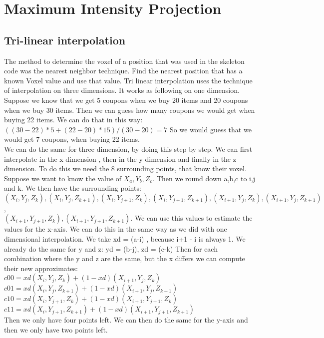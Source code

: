 \section{Maximum Intensity Projection}\label{Sec:Mip}
\subsection{Tri-linear interpolation}
The method to determine the voxel of a position that was used in the skeleton code was the nearest neighbor technique. 
Find the nearest position that has a known Voxel value and use that value. 
Tri linear interpolation uses the technique of interpolation on three dimensions.
 It works as following on one dimension. 
Suppose we know that we get 5 coupons when we buy 20 items and 20 coupons when we buy 30 items. 
Then we can guess how many coupons we would get when buying 22 items. 
We can do that in this way: $((30-22)*5 + (22-20)*15)/(30-20) = 7$ 
So we would guess that we would get 7 coupons, when buying 22 items. \\
We can do the same for three dimension, by doing this step by step. 
We can first interpolate in the x dimension , then in the y dimension and finally in the z dimension.
To do this we need the 8 surrounding points, that know their voxel. 
Suppose we want to know the value of $X_{a},Y_{b},Z_{c}$. 
Then we round down a,b,c to i,j and k. 
We then have the surrounding points: $(X_{i},Y_{j},Z_{k}), (X_{i},Y_{j}, Z_{k+1}), (X_{i},Y_{j+1},Z_{k}),
 (X_{i},Y_{j+1},Z_{k+1}), (X_{i+1},Y_{j},Z_{k}), (X_{i+1},Y_{j},Z_{k+1})$, \\ $ (X_{i+1},Y_{j+1},Z_{k}) , (X_{i+1},Y_{j+1},Z_{k+1})$. 
We can use this values to estimate the values for the x-axis. 
We can do this in the same way as we did with one dimensional interpolation. 
We take xd = (a-i) , because i+1 - i is always 1.
We already do the same for y and z: yd = (b-j), zd = (c-k) 
Then for each combination where the y and z are the same, but the x differs we can compute their new approximates: \\
$c00 = xd(X_{i},Y_{j},Z_{k})+(1-xd)(X_{i+1},Y_{j},Z_{k})$ \\
$c01 = xd(X_{i},Y_{j},Z_{k+1})+(1-xd)(X_{i+1},Y_{j},Z_{k+1})$ \\
$c10 = xd(X_{i},Y_{j+1},Z_{k})+(1-xd)(X_{i+1},Y_{j+1},Z_{k})$ \\
$c11 = xd(X_{i},Y_{j+1},Z_{k+1})+(1-xd)(X_{i+1},Y_{j+1},Z_{k+1})$ \\
Then we only have four points left. We can then do the same for the y-axis and then we only have two points left. \\
